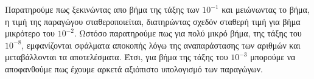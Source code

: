 Παρατηρούμε πως ξεκινώντας απο βήμα της τάξης των $10^{-1}$ και μειώνωντας το βήμα, η τιμή της παραγώγου σταθεροποιείται, διατηρώντας σχεδόν σταθερή τιμή για βήμα μικρότερο του $10^{-2}$. Ωστόσο παρατηρούμε πως για πολύ μικρό βήμα, της τάξης του $10^{-8}$, εμφανίζονται σφάλματα αποκοπής λόγω της αναπαράστασης των αριθμών και μεταβάλλονται τα αποτελέσματα. Έτσι, για βήμα της τάξης του $10^{-3}$ μπορούμε να αποφανθούμε πως έχουμε αρκετά αξιόπιστο υπολογισμό των παραγώγων.


